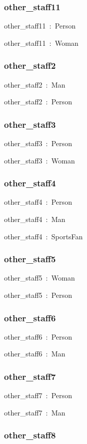 \documentclass{article}
\begin{document}
\subsubsection*{other\_staff11}

other\_staff11~:~Person

other\_staff11~:~Woman

\subsubsection*{other\_staff2}

other\_staff2~:~Man

other\_staff2~:~Person

\subsubsection*{other\_staff3}

other\_staff3~:~Person

other\_staff3~:~Woman

\subsubsection*{other\_staff4}

other\_staff4~:~Person

other\_staff4~:~Man

other\_staff4~:~SportsFan

\subsubsection*{other\_staff5}

other\_staff5~:~Woman

other\_staff5~:~Person

\subsubsection*{other\_staff6}

other\_staff6~:~Person

other\_staff6~:~Man

\subsubsection*{other\_staff7}

other\_staff7~:~Person

other\_staff7~:~Man

\subsubsection*{other\_staff8}
\end{document}
